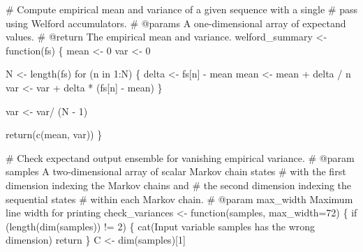 \documentclass[
  letterpaper,
  DIV=11,
  numbers=noendperiod]{scrartcl}
\newenvironment{Shaded}{\begin{snugshade}}{\end{snugshade}}
\newcommand{\AttributeTok}[1]{\textcolor[rgb]{0.40,0.45,0.13}{#1}}
\newcommand{\CommentTok}[1]{\textcolor[rgb]{0.37,0.37,0.37}{#1}}
\newcommand{\ControlFlowTok}[1]{\textcolor[rgb]{0.00,0.23,0.31}{#1}}
\newcommand{\DecValTok}[1]{\textcolor[rgb]{0.68,0.00,0.00}{#1}}
\newcommand{\FunctionTok}[1]{\textcolor[rgb]{0.28,0.35,0.67}{#1}}
\newcommand{\NormalTok}[1]{\textcolor[rgb]{0.00,0.23,0.31}{#1}}
\newcommand{\OtherTok}[1]{\textcolor[rgb]{0.00,0.23,0.31}{#1}}
\newcommand{\SpecialCharTok}[1]{\textcolor[rgb]{0.37,0.37,0.37}{#1}}
\newcommand{\StringTok}[1]{\textcolor[rgb]{0.13,0.47,0.30}{#1}}
\begin{document}
\begin{Shaded}
\begin{Highlighting}[]
\CommentTok{\# Compute empirical mean and variance of a given sequence with a single}
\CommentTok{\# pass using Welford accumulators.}
\CommentTok{\# @params A one{-}dimensional array of expectand values.}
\CommentTok{\# @return The empirical mean and variance.}
\NormalTok{welford\_summary }\OtherTok{\textless{}{-}} \ControlFlowTok{function}\NormalTok{(fs) \{}
\NormalTok{  mean }\OtherTok{\textless{}{-}} \DecValTok{0}
\NormalTok{  var }\OtherTok{\textless{}{-}} \DecValTok{0}

\NormalTok{  N }\OtherTok{\textless{}{-}} \FunctionTok{length}\NormalTok{(fs)}
  \ControlFlowTok{for}\NormalTok{ (n }\ControlFlowTok{in} \DecValTok{1}\SpecialCharTok{:}\NormalTok{N) \{}
\NormalTok{    delta }\OtherTok{\textless{}{-}}\NormalTok{ fs[n] }\SpecialCharTok{{-}}\NormalTok{ mean}
\NormalTok{    mean }\OtherTok{\textless{}{-}}\NormalTok{ mean }\SpecialCharTok{+}\NormalTok{ delta }\SpecialCharTok{/}\NormalTok{ n}
\NormalTok{    var }\OtherTok{\textless{}{-}}\NormalTok{ var }\SpecialCharTok{+}\NormalTok{ delta }\SpecialCharTok{*}\NormalTok{ (fs[n] }\SpecialCharTok{{-}}\NormalTok{ mean)}
\NormalTok{  \}}

\NormalTok{  var }\OtherTok{\textless{}{-}}\NormalTok{ var}\SpecialCharTok{/}\NormalTok{ (N }\SpecialCharTok{{-}} \DecValTok{1}\NormalTok{)}

  \FunctionTok{return}\NormalTok{(}\FunctionTok{c}\NormalTok{(mean, var))}
\NormalTok{\}}

\CommentTok{\# Check expectand output ensemble for vanishing empirical variance.}
\CommentTok{\# @param samples A two{-}dimensional array of scalar Markov chain states }
\CommentTok{\#                with the first dimension indexing the Markov chains and }
\CommentTok{\#                the second dimension indexing the sequential states }
\CommentTok{\#                within each Markov chain.}
\CommentTok{\# @param max\_width Maximum line width for printing}
\NormalTok{check\_variances }\OtherTok{\textless{}{-}} \ControlFlowTok{function}\NormalTok{(samples, }\AttributeTok{max\_width=}\DecValTok{72}\NormalTok{) \{}
  \ControlFlowTok{if}\NormalTok{ (}\FunctionTok{length}\NormalTok{(}\FunctionTok{dim}\NormalTok{(samples)) }\SpecialCharTok{!=} \DecValTok{2}\NormalTok{) \{}
    \FunctionTok{cat}\NormalTok{(}\StringTok{\textquotesingle{}Input variable \textasciigrave{}samples\textasciigrave{} has the wrong dimension\textquotesingle{}}\NormalTok{)}
\NormalTok{    return}
\NormalTok{  \}}
\NormalTok{  C }\OtherTok{\textless{}{-}} \FunctionTok{dim}\NormalTok{(samples)[}\DecValTok{1}\NormalTok{]}
  

\end{Highlighting}
\end{Shaded}
\end{document}
